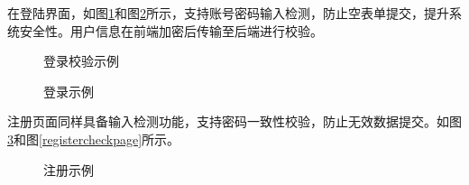 \documentclass[UTF8,a4paper,12pt]{ctexart}
\numberwithin{equation}{section}
\begin{document}
在登陆界面，如图\ref{logincheck}和图\ref{loginpage}所示，支持账号密码输入检测，防止空表单提交，提升系统安全性。用户信息在前端加密后传输至后端进行校验。
\begin{figure}[H]
	\caption{登录校验示例}
	\label{logincheck}
\end{figure}
\begin{figure}[H]
	\caption{登录示例}
	\label{loginpage}
\end{figure}
注册页面同样具备输入检测功能，支持密码一致性校验，防止无效数据提交。如图\ref{registerpage}和图\ref{registercheckpage}所示。
\begin{figure}[H]
	\caption{注册示例}
	\label{registerpage}
\end{figure}
\end{document}
